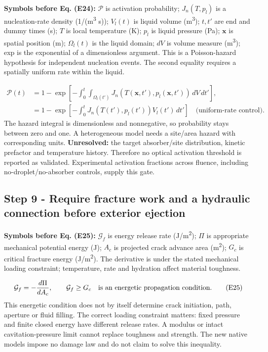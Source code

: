\documentclass[10pt,a4paper]{article}
\begin{document}
\textbf{Symbols before Eq. (E24):} $\mathcal P$ is activation probability; $J_n(T,p_l)$ is a nucleation-rate density (1/(m\textsuperscript{3} s)); $V_l(t)$ is liquid volume (m\textsuperscript{3}); $t,t'$ are end and dummy times (s); $T$ is local temperature (K); $p_l$ is liquid pressure (Pa); $\mathbf x$ is spatial position (m); $\Omega_l(t)$ is the liquid domain; $dV$ is volume measure (m\textsuperscript{3}); exp is the exponential of a dimensionless argument. This is a Poisson-hazard hypothesis for independent nucleation events. The second equality requires a spatially uniform rate within the liquid.

{\small\begin{align*}
\mathcal P(t)&=1-\exp\left[-\int_0^t\int_{\Omega_l(t')}J_n(T(\mathbf x,t'),p_l(\mathbf x,t'))\,dV\,dt'\right],\\
&=1-\exp\left[-\int_0^t J_n(T(t'),p_l(t'))V_l(t')\,dt'\right]\quad\text{(uniform-rate control)}. \tag{E24}
\end{align*}}
The hazard integral is dimensionless and nonnegative, so probability stays between zero and one. A heterogeneous model needs a site/area hazard with corresponding units. \textbf{Unresolved:} the target absorber/site distribution, kinetic prefactor and temperature history. Therefore no optical activation threshold is reported as validated. Experimental activation fractions across fluence, including no-droplet/no-absorber controls, supply this gate.

\subsection*{Step 9  -  Require fracture work and a hydraulic connection before exterior ejection}
\textbf{Symbols before Eq. (E25):} $\mathcal G_f$ is energy release rate (J/m\textsuperscript{2}); $\Pi$ is appropriate mechanical potential energy (J); $A_c$ is projected crack advance area (m\textsuperscript{2}); $G_c$ is critical fracture energy (J/m\textsuperscript{2}). The derivative is under the stated mechanical loading constraint; temperature, rate and hydration affect material toughness.

{\small\begin{align*}
\mathcal G_f=-\frac{d\Pi}{dA_c},\qquad
\mathcal G_f\ge G_c\quad\hbox{is an energetic propagation condition}. \tag{E25}
\end{align*}}
This energetic condition does not by itself determine crack initiation, path, aperture or fluid filling. The correct loading constraint matters: fixed pressure and finite closed energy have different release rates. A modulus or intact cavitation-pressure limit cannot replace toughness and strength. The new native models impose no damage law and do not claim to solve this inequality.
\end{document}
